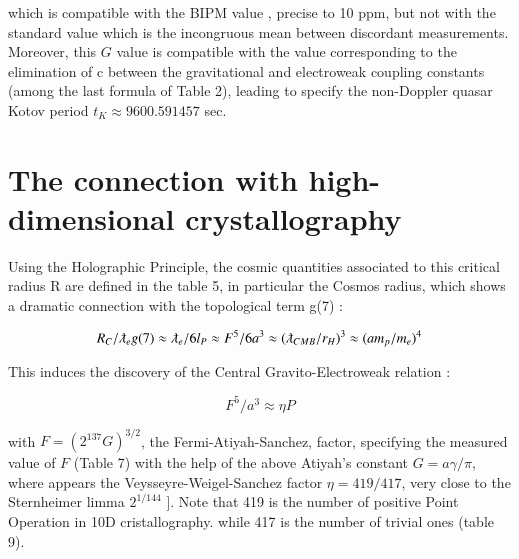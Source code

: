 \documentclass[a4paper,9pt]{article}
\begin{document}
which is compatible with the BIPM value \cite{Quinn}, precise to 10 ppm, but not with the standard value \cite{Tannabashi} which is the incongruous mean between discordant measurements. Moreover, this $G$ value is compatible with the value corresponding to the elimination of c between the gravitational and electroweak coupling constants (among the last formula of Table 2), leading to specify the non-Doppler quasar Kotov period $t_K \approx 9600.591457$ sec.

\section{The connection with high-dimensional crystallography}

Using the Holographic Principle, the cosmic quantities associated to this critical radius R are defined in the table 5, in particular the Cosmos radius, which shows a dramatic connection with the topological term g(7) :

\begin{equation}
R_{C}/\lambdabar_{e} g(7) \approx  \lambdabar_{e}/6l_P \approx F^5/6a^3 \approx (\lambdabar_{CMB}/r_H)^3 \approx  (am_p/m_e)^4  
\end{equation}

This induces the discovery of the Central Gravito-Electroweak relation :

\begin{equation*}
F^5/a^3 \approx \eta P    
\end{equation*}{}
  

with  $F = (2^137 G)^{3/2}$, the Fermi-Atiyah-Sanchez, factor, specifying the measured value of  $F$ (Table 7) with the help of the above Atiyah's constant $G = a \gamma/ \pi$, where appears the Veysseyre-Weigel-Sanchez factor $\eta = 419/417$, very close to the Sternheimer limma $2^{1/144}$ \cite{Sternheimer}]. Note that 419 is the number of positive Point Operation in 10D cristallography. while 417 is the number of trivial ones \cite{Weigel} (table 9).
\end{document}
